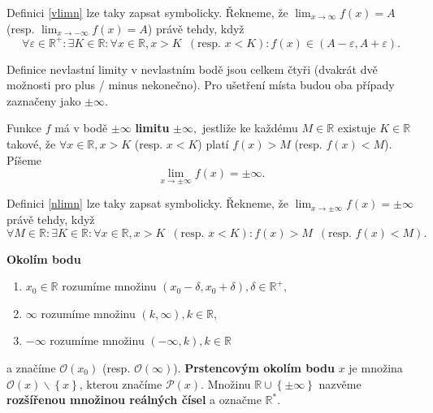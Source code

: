 \begin{pozn}
Definici \ref{vlimn} lze taky zapsat symbolicky. Řekneme, že
$\lim_{x\to \infty} f(x) =A$ (resp. $\lim_{x\to -\infty} f(x) =A$) právě tehdy, když
$$
\forall \varepsilon \in \mathbb R^+:
    \exists K \in \mathbb R: \forall x \in \mathbb R, x > K \,\,\, (\textrm{resp. } x< K):
    f(x) \in \left ( A-\varepsilon, A+\varepsilon \right ).
$$
\end{pozn}

\begin{pozn}
    Definice nevlastní limity v nevlastním bodě jsou celkem čtyři (dvakrát
    dvě možnosti pro plus / minus nekonečno).
    Pro ušetření místa budou oba případy zaznačeny jako $\pm \infty$.
\end{pozn}

\begin{definition}\label{nlimn}
    Funkce $f$ má v bodě $\pm \infty$ \textbf{limitu} $\pm \infty,$
    jestliže ke každému $M \in \mathbb R$ existuje
    $K \in \mathbb R$ takové, že $\forall x \in
    \mathbb R, x> K $ (resp. $x<K$) platí $f(x)>M$ (resp. $f(x) <M$). Píšeme
    $$\lim_{x\to \pm\infty}f(x)=\pm \infty.$$
\end{definition}

\begin{pozn}
    Definici \ref{nlimn} lze taky zapsat symbolicky. Řekneme, že
    $\lim_{x\to \pm\infty} f(x) =\pm\infty$ právě tehdy, když
    $$
    \forall M \in \mathbb R:
        \exists K \in \mathbb R: \forall x \in \mathbb R, x>K\,\,\, (\textrm{resp. }x<K):
        f(x) > M \,\,\, (\textrm{resp. } f(x)<M).
    $$
\end{pozn}

\begin{definition}
\textbf{Okolím bodu}
\begin{enumerate}[$i.$]
\item $x_0\in \mathbb R$ rozumíme množinu $(x_0-\delta,x_0+\delta), \delta \in \mathbb R^+,$
\item $\infty$ rozumíme množinu $(k,\infty), k\in \mathbb R,$
\item $-\infty$ rozumíme množinu $(-\infty,k), k\in \mathbb R$
\end{enumerate}
a značíme $\mathscr O(x_0)$ (resp. $\mathscr O(\infty)$). \textbf{Prstencovým okolím
bodu} $x$ je množina $\mathscr O(x)\smallsetminus\left \{ x \right \} $, kterou značíme $\mathscr P(x).$
Množinu $\mathbb R \cup \left \{ \pm \infty \right \} $ nazvěme \textbf{rozšířenou množinou
reálných čísel} a označme $\mathbb R^*.$
\end{definition}

